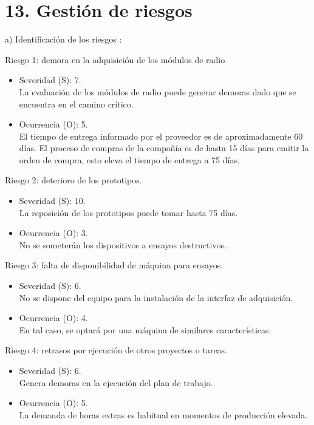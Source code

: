 \documentclass[
11pt%
]{charter}
\begin{document}
\section{13. Gestión de riesgos}
\label{sec:riesgos}

a) Identificación de los riesgos :
 
Riesgo 1:  demora en la adquisición de los módulos de radio
\begin{itemize}
	\item Severidad (S): 7.\\ La evaluación de los módulos de radio puede generar demoras dado que se encuentra en el camino crítico.
	\item Ocurrencia (O): 5.\\El tiempo de entrega informado por el proveedor es de aproximadamente 60 días. El proceso de compras de la compañía es de hasta 15 días para emitir la orden de compra, esto eleva el tiempo de entrega a 75 días.
\end{itemize}

Riesgo 2: deterioro de los prototipos.
\begin{itemize}
	\item Severidad (S): 10.\\La reposición de los prototipos puede tomar hasta 75 días.
	\item Ocurrencia (O): 3.\\No se someterán los dispositivos a ensayos destructivos.
\end{itemize}

Riesgo 3: falta de disponibilidad de máquina para ensayos.
\begin{itemize}
	\item Severidad (S): 6.\\No se dispone del equipo para la instalación de la interfaz de adquisición.
	\item Ocurrencia (O): 4.\\En tal caso, se optará por una máquina de similares características.
\end{itemize}

Riesgo 4: retrasos por ejecución de otros proyectos o tareas.
\begin{itemize}
	\item Severidad (S): 6.\\Genera demoras en la ejecución del plan de trabajo.
	\item Ocurrencia (O): 5.\\La demanda de horas extras es habitual en momentos de producción elevada.
\end{itemize}
\end{document}
